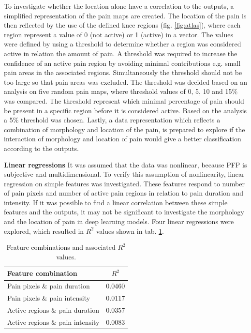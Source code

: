 \noindent
To investigate whether the location alone have a correlation to the outputs, a simplified representation of the pain maps are created. The location of the pain is then reflected by the use of the defined knee regions (fig. \ref{fig:atlas}), where each region represent a value of 0 (not active) or 1 (active) in a vector.  The values were defined by using a threshold to determine whether a region was considered active in relation the amount of pain. A threshold was required to increase the confidence of an active pain region by avoiding minimal contributions e.g. small pain areas in the associated regions. Simultaneously the threshold should not be too large so that pain areas was excluded. The threshold was decided based on an analysis on five random pain maps, where threshold values of 0, 5, 10 and 15\% was compared. The threshold represent which minimal percentage of pain should be present in a specific region before it is considered active. Based on the analysis a 5\% threshold was chosen. \newline
\noindent
Lastly, a data representation which reflects a combination of morphology and location of the pain, is prepared to explore if the interaction of morphology and location of pain would give a better classification according to the outputs. \newline

\noindent
\textbf{Linear regressions} \newline
\noindent
It was assumed that the data was nonlinear, because PFP is subjective and multidimensional. To verify this assumption of nonlinearity, linear regression on simple features was investigated. These features respond to number of pain pixels and number of active pain regions in relation to pain duration and intensity. If it was possible to find a linear correlation between these simple features and the outputs, it may not be significant to investigate the morphology and the location of pain in deep learning models. Four linear regressions were explored, which resulted in $R^2$ values shown in tab. \ref{tab:Rvalues}.

\begin{table}[h]
\centering
\begin{tabular}{@{}lc@{}}
\toprule
{\textbf{Feature combination}} & \textbf{$R^2$} \\ \midrule
Pain pixels \& pain duration                  & 0.0460         \\
Pain pixels \& pain intensity                    & 0.0117         \\
Active regions \& pain duration               & 0.0357         \\
Active regions \& pain intensity                 & 0.0083         \\ \bottomrule
\end{tabular}
\caption{Feature combinations and associated $R^2$ values.}
\label{tab:Rvalues}
\end{table}

